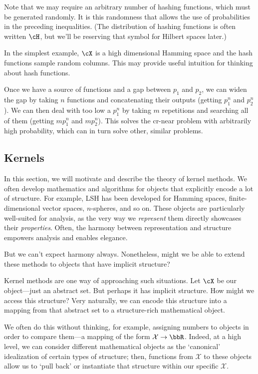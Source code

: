 \documentclass[twoside,11pt]{homework}
\begin{document}
Note that we may require an arbitrary number of hashing functions,
which must be generated randomly.  It is this randomness that allows
the use of probabilities in the preceding inequalities.  (The
distribution of hashing functions is often written $\cH$, but we'll be
reserving that symbol for Hilbert spaces later.)

In the simplest example, $\cX$ is a high dimensional Hamming space and
the hash functions sample random columns.  This may provide useful
intuition for thinking about hash functions.

Once we have a source of functions and a gap between $p_1$ and $p_2$,
we can widen the gap by taking $n$ functions and concatenating their
outputs (getting $p_1^n$ and $p_2^n$).  We can then deal with too low
a $p_1^n$ by taking $m$ repetitions and searching all of them (getting
$mp_1^n$ and $mp_2^n$).  This solves the cr-near problem with
arbitrarily high probability, which can in turn solve other, similar
problems.


\subsection{Kernels} %

In this section, we will motivate and describe the theory of kernel methods. We often develop mathematics and algorithms for objects that explicitly encode a lot of structure. For example, LSH has been developed for Hamming spaces, finite-dimensional vector spaces, $n$-spheres, and so on. These objects are particularly well-suited for analysis, as the very way we \emph{represent} them directly showcases their \emph{properties}. Often, the harmony between representation and structure empowers analysis and enables elegance.

But we can't expect harmony always. Nonetheless, might we be able to extend these methods to objects that have implicit structure?

Kernel methods are one way of approaching such situations. Let $\cX$ be our object---just an abstract set. But perhaps it has implicit structure. How might we access this structure? Very naturally, we can encode this structure into a mapping from that abstract set to a structure-rich mathematical object.

We often do this without thinking, for example, assigning numbers to objects in order to compare them---a mapping of the form $\mathcal{X} \to \bbR$. Indeed, at a high level, we can consider different mathematical objects as the `canonical' idealization of certain types of structure; then, functions from $\mathcal{X}$ to these objects allow us to `pull back' or instantiate that structure within our specific $\mathcal{X}$.
\end{document}
